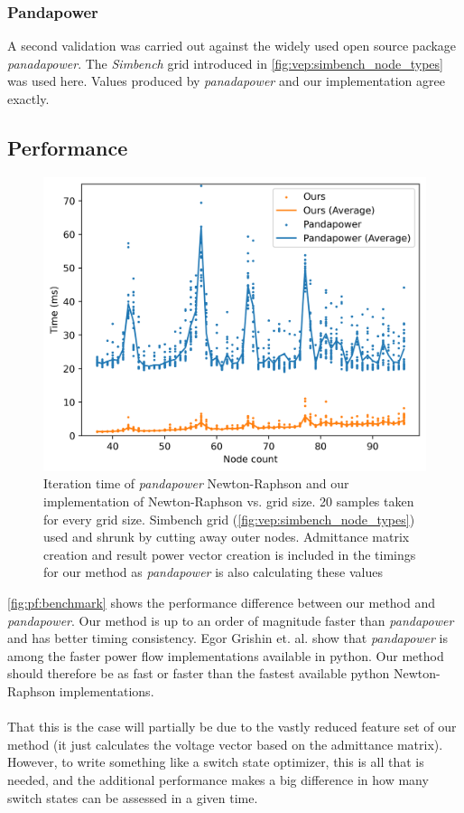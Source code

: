 \subsubsection{Pandapower}

A second validation was carried out against the widely used open source package
\textit{panadapower}\autocite{pandapower2018}. The \textit{Simbench} grid
introduced in \autoref{fig:vep:simbench_node_types} was used here. Values
produced by \textit{panadapower} and our implementation agree exactly.

\subsection{Performance}


\begin{figure}[H]
    \centering
    \includegraphics[width=.65\linewidth]{img/benchmark/pandapower_avg.png}
    \caption{
        Iteration time of \textit{pandapower}\autocite{pandapower2018} Newton-Raphson and our implementation of
        Newton-Raphson vs. grid size. 20 samples taken for every grid size. Simbench
        grid (\autoref{fig:vep:simbench_node_types}) used and shrunk by cutting
        away outer nodes. Admittance matrix creation and result power vector creation 
        is included in the timings for our method as \textit{pandapower} is also calculating
        these values
    }
    \label{fig:pf:benchmark}
\end{figure}

\autoref{fig:pf:benchmark} shows the performance difference between our method and \textit{pandapower}.
Our method is up to an order of magnitude faster than \textit{pandapower} and has better timing
consistency. Egor Grishin et. al. show that \textit{pandapower} is among the faster power flow
implementations available in python\autocite{newton_raphson_python}. Our method should therefore
be as fast or faster than the fastest available python Newton-Raphson implementations.\\
\\
That this is the case will partially be due to the vastly reduced feature set of our method
(it just calculates the voltage vector based on the admittance matrix). However, to write
something like a switch state optimizer, this is all that is needed, and the additional
performance makes a big difference in how many switch states can be assessed in a given time.
